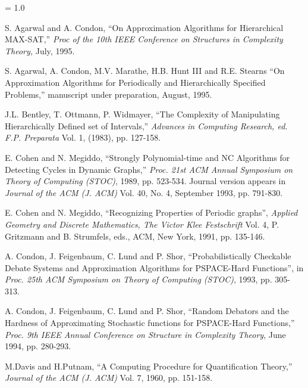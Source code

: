 


\baselineskip = 1.0\normalbaselineskip
\begin{thebibliography}{HMRR93}


 S. Agarwal and  A. Condon, 
``On Approximation Algorithms for Hierarchical MAX-SAT,''
{\em Proc of the 10th IEEE Conference on Structures in Complexity Theory,} 
July, 1995.


 S. Agarwal, A. Condon, 
M.V. Marathe, H.B. Hunt III and R.E. Stearns 
``On Approximation Algorithms for Periodically and Hierarchically Specified
Problems,'' manuscript under preparation,
August, 1995.


 J.L. Bentley, T. Ottmann, P. Widmayer,
``The Complexity of Manipulating Hierarchically Defined set of Intervals,''
{\em Advances in Computing Research, ed.  F.P. Preparata} 
Vol. 1, (1983), pp. 127-158.





E. Cohen and  N. Megiddo,
``Strongly Polynomial-time and NC Algorithms for 
Detecting Cycles in Dynamic Graphs,''
{\em Proc. 21st ACM Annual Symposium on Theory of Computing (STOC)}, 
1989, pp. 523-534. 
Journal version  appears in {\em Journal of the ACM (J. ACM)} Vol. 40,
No. 4, September 1993, pp. 791-830.




E. Cohen and N. Megiddo,
``Recognizing Properties of Periodic graphs'',
{\em Applied Geometry and Discrete Mathematics, The Victor Klee Festschrift}
Vol. 4, P. Gritzmann and B. Strumfels, eds., ACM, New York, 1991, pp. 135-146.




 A. Condon, J. Feigenbaum, C. Lund and P. Shor,
``Probabilistically Checkable Debate Systems and Approximation Algorithms
for PSPACE-Hard Functions'', in  
{\em Proc.  25th ACM Symposium on Theory of Computing (STOC)}, 
1993, pp. 305-313.


 A. Condon, J. Feigenbaum, C. Lund and P. Shor,
``Random Debators and the Hardness of Approximating
Stochastic functions for PSPACE-Hard Functions,'' 
{\em Proc. 9th IEEE Annual Conference on Structure in Complexity Theory}, 
June 1994, pp. 280-293. 


M.Davis and H.Putnam, 
``A Computing Procedure for Quantification Theory,''
{\em Journal of the ACM (J. ACM)} 
Vol. 7, 1960, pp. 151-158.





\end{thebibliography}
